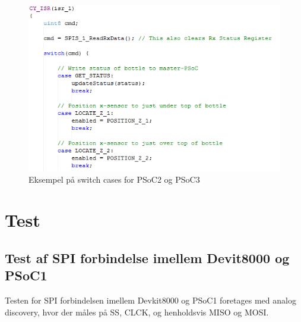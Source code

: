 \begin{figure}[H]
\includegraphics[scale=0.9]{Screenshots/PSOC_switch_slave}
\caption{Eksempel på switch cases for PSoC2 og PSoC3}
\end{figure}     
 
\section{Test}

\subsection{Test af SPI forbindelse imellem Devit8000 og PSoC1}

Testen for SPI forbindelsen imellem Devkit8000 og PSoC1 foretages med analog discovery, hvor der måles på SS, CLCK, og henholdsvis MISO og MOSI.

